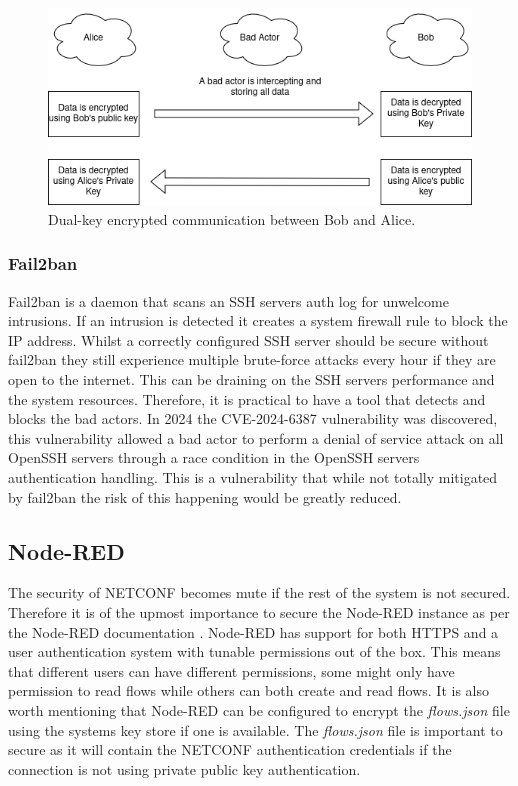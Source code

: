 \documentclass[12pt]{article}
\begin{document}
\begin{figure}
  \centering
  \includegraphics[width=\textwidth]{dual-key.png}
  \caption{Dual-key encrypted communication between Bob and Alice.}
  \label{fig:dual-key}
\end{figure}

\subsubsection{Fail2ban}
Fail2ban is a daemon \cite{Fail2banFail2ban2025} that scans an SSH servers auth log for 
unwelcome intrusions. If an intrusion is detected it creates a system firewall rule to block the IP address.
Whilst a correctly configured SSH server should be secure without fail2ban they still experience multiple brute-force attacks
every hour if they are open to the internet. This can be draining on the SSH servers performance and the system resources.
Therefore, it is practical to have a tool that detects and blocks the bad actors. In 2024 the CVE-2024-6387 \cite{CVERecordCVE20246387} vulnerability
was discovered, this vulnerability allowed a bad actor to perform a denial of service attack on all OpenSSH servers through 
a race condition in the OpenSSH servers authentication handling. This is a vulnerability that while not 
totally mitigated by fail2ban the risk of this happening would be greatly reduced.

\subsection{Node-RED}
The security of NETCONF becomes mute if the rest of the system is not secured. Therefore it is of the upmost 
importance to secure the Node-RED instance as per the Node-RED documentation \cite{SecuringNodeREDNodeRED}.
Node-RED has support for both HTTPS and a user authentication system with tunable permissions out of the box.
This means that different users can have different permissions, some might only have permission to read flows while others
can both create and read flows. It is also worth mentioning that Node-RED can be configured to encrypt the \textit{flows.json} file using 
the systems key store if one is available. The \textit{flows.json} file is important to secure as it will contain the NETCONF authentication credentials
if the connection is not using private public key authentication. 
\end{document}
